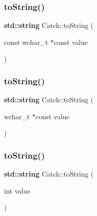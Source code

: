 \mbox{\label{namespace_catch_afa173b4639c682c9d8c20fae0939693c}} 
\subsubsection{\texorpdfstring{to\+String()}{toString()}\hspace{0.1cm}{\footnotesize\ttfamily [6/17]}}
{\footnotesize\ttfamily \textbf{ std\+::string} Catch\+::to\+String (\begin{DoxyParamCaption}\item[{const wchar\+\_\+t $\ast$const}]{value }\end{DoxyParamCaption})}

\mbox{\label{namespace_catch_aa39121565abe9f30fce5d48e4e094768}} 
\subsubsection{\texorpdfstring{to\+String()}{toString()}\hspace{0.1cm}{\footnotesize\ttfamily [7/17]}}
{\footnotesize\ttfamily \textbf{ std\+::string} Catch\+::to\+String (\begin{DoxyParamCaption}\item[{wchar\+\_\+t $\ast$const}]{value }\end{DoxyParamCaption})}

\mbox{\label{namespace_catch_acee54d0580385e4347bc42a7d22bc893}} 
\subsubsection{\texorpdfstring{to\+String()}{toString()}\hspace{0.1cm}{\footnotesize\ttfamily [8/17]}}
{\footnotesize\ttfamily \textbf{ std\+::string} Catch\+::to\+String (\begin{DoxyParamCaption}\item[{int}]{value }\end{DoxyParamCaption})}

\mbox{\label{namespace_catch_aba1d78bce62f8c73cbfc2a14225356ea}} 
